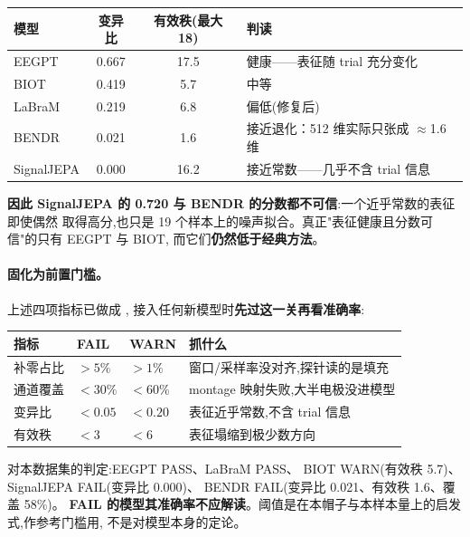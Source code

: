 \documentclass[11pt]{ctexart}
\begin{document}
\begin{center}\small
\begin{tabular}{@{}lccl@{}}
\toprule
模型 & 变异比 & 有效秩(最大 18) & 判读 \\
\midrule
EEGPT      & 0.667 & 17.5 & \textcolor{good}{健康}——表征随 trial 充分变化 \\
BIOT       & 0.419 & 5.7  & 中等 \\
LaBraM     & 0.219 & 6.8  & 偏低(修复后) \\
BENDR      & \textcolor{bad}{0.021} & \textcolor{bad}{1.6} & \textcolor{bad}{接近退化}：512 维实际只张成 $\approx$1.6 维 \\
SignalJEPA & \textcolor{bad}{0.000} & 16.2 & \textcolor{bad}{接近常数}——几乎不含 trial 信息 \\
\bottomrule
\end{tabular}
\end{center}

\noindent\textbf{因此 SignalJEPA 的 0.720 与 BENDR 的分数都不可信}:一个近乎常数的表征即使偶然
取得高分,也只是 19 个样本上的噪声拟合。真正"表征健康且分数可信"的只有 EEGPT 与 BIOT,
而它们\textbf{仍然低于经典方法}。

\paragraph{固化为前置门槛。}上述四项指标已做成 ,
接入任何新模型时\textbf{先过这一关再看准确率}:

\begin{center}\small
\begin{tabular}{@{}llll@{}}
\toprule
指标 & FAIL & WARN & 抓什么 \\
\midrule
补零占比      & $>5\%$    & $>1\%$    & 窗口/采样率没对齐,探针读的是填充 \\
通道覆盖      & $<30\%$   & $<60\%$   & montage 映射失败,大半电极没进模型 \\
变异比        & $<0.05$   & $<0.20$   & 表征近乎常数,不含 trial 信息 \\
有效秩        & $<3$      & $<6$      & 表征塌缩到极少数方向 \\
\bottomrule
\end{tabular}
\end{center}

\noindent 对本数据集的判定:EEGPT \textcolor{good}{PASS}、LaBraM \textcolor{good}{PASS}、
BIOT \textcolor{warn}{WARN}(有效秩 5.7)、SignalJEPA \textcolor{bad}{FAIL}(变异比 0.000)、
BENDR \textcolor{bad}{FAIL}(变异比 0.021、有效秩 1.6、覆盖 58\%)。
\textbf{FAIL 的模型其准确率不应解读}。阈值是在本帽子与本样本量上的启发式,作参考门槛用,
不是对模型本身的定论。
\end{document}
